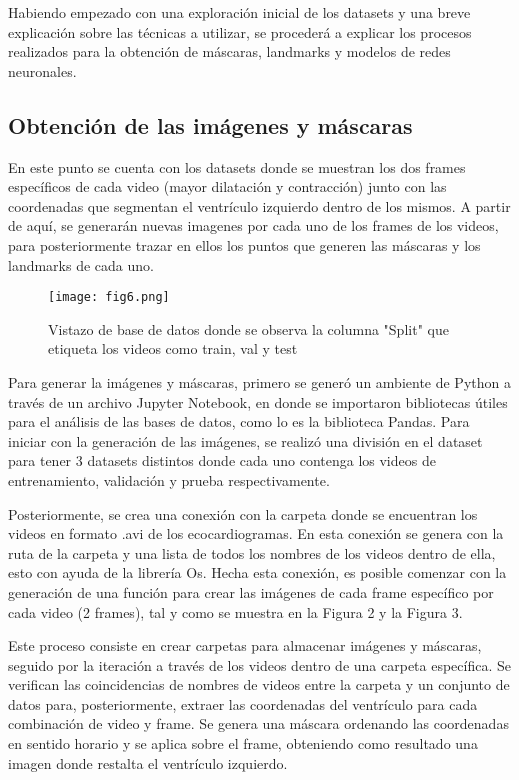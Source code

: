 \documentclass[runningheads]{llncs}
\begin{document}
Habiendo empezado con una exploración inicial de los datasets y una breve explicación  sobre las técnicas a utilizar, se procederá a explicar los procesos realizados para la obtención de máscaras, landmarks y modelos de redes neuronales.

\subsection{Obtención de las imágenes y máscaras}

En este punto se cuenta con los datasets donde se muestran los dos frames específicos de cada video (mayor dilatación y contracción) junto con las coordenadas que segmentan el ventrículo izquierdo dentro de los mismos. A partir de aquí, se generarán nuevas imagenes por cada uno de los frames de los videos, para posteriormente trazar en ellos los puntos que generen las máscaras y los landmarks de cada uno.

\begin{figure} [H]
    \centering
    \texttt{[image: fig6.png]}
    \caption{Vistazo de base de datos donde se observa la columna "Split" que etiqueta los videos como train, val  y test}
    \label{fig:fig6}
\end{figure}

Para generar la imágenes y máscaras, primero se generó un ambiente de Python a través de un archivo Jupyter Notebook, en donde se importaron bibliotecas útiles para el análisis de las bases de datos, como lo es la biblioteca Pandas. Para iniciar con la generación de las imágenes, se realizó una división en el dataset para tener 3 datasets distintos donde cada uno contenga los videos de entrenamiento, validación y prueba respectivamente.

Posteriormente, se crea una conexión con la carpeta donde se encuentran los videos en formato .avi de los ecocardiogramas. En esta conexión se genera con la ruta de la carpeta y una lista de todos los nombres de los videos dentro de ella, esto con ayuda de la librería Os. Hecha esta conexión, es posible comenzar con la generación de una función para crear las imágenes de cada frame específico por cada video (2 frames), tal y como se muestra en la  Figura 2 y la Figura 3. 

Este proceso consiste en crear carpetas para almacenar imágenes y máscaras, seguido por la iteración a través de los videos dentro de una carpeta específica. Se verifican las coincidencias de nombres de videos entre la carpeta y un conjunto de datos para, posteriormente, extraer las coordenadas del ventrículo para cada combinación de video y frame. Se genera una máscara ordenando las coordenadas en sentido horario y se aplica sobre el frame, obteniendo como resultado una imagen donde restalta el ventrículo izquierdo.
\end{document}
